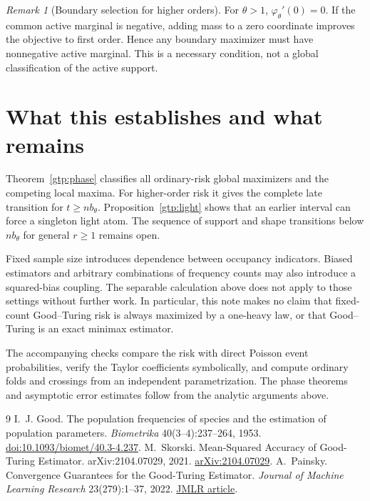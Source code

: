 \documentclass[11pt]{article}
\theoremstyle{remark}\newtheorem{remark}[theorem]{Remark}
\begin{document}
\begin{remark}[Boundary selection for higher orders]
For \(\theta>1\), \(\varphi_\theta'(0)=0\). If the common active marginal is negative, adding mass to a zero coordinate improves the objective to first order. Hence any boundary maximizer must have nonnegative active marginal. This is a necessary condition, not a global classification of the active support.
\end{remark}



\section{What this establishes and what remains}
Theorem~\ref{gtp:phase} classifies all ordinary-risk global maximizers and the competing local maxima. For higher-order risk it gives the complete late transition for $t\ge nb_\theta$. Proposition~\ref{gtp:light} shows that an earlier interval can force a singleton light atom. The sequence of support and shape transitions below $nb_\theta$ for general $r\ge1$ remains open.

Fixed sample size introduces dependence between occupancy indicators. Biased estimators and arbitrary combinations of frequency counts may also introduce a squared-bias coupling. The separable calculation above does not apply to those settings without further work. In particular, this note makes no claim that fixed-count Good--Turing risk is always maximized by a one-heavy law, or that Good--Turing is an exact minimax estimator.

The accompanying checks compare the risk with direct Poisson event probabilities, verify the Taylor coefficients symbolically, and compute ordinary folds and crossings from an independent parametrization. The phase theorems and asymptotic error estimates follow from the analytic arguments above.

\begin{thebibliography}{9}
 I.~J. Good.
The population frequencies of species and the estimation of population parameters.
\emph{Biometrika} 40(3--4):237--264, 1953.
\href{https://doi.org/10.1093/biomet/40.3-4.237}{doi:10.1093/biomet/40.3-4.237}.
 M.~Skorski.
Mean-Squared Accuracy of Good-Turing Estimator.
arXiv:2104.07029, 2021.
\href{https://arxiv.org/abs/2104.07029}{arXiv:2104.07029}.
 A.~Painsky.
Convergence Guarantees for the Good-Turing Estimator.
\emph{Journal of Machine Learning Research} 23(279):1--37, 2022.
\href{https://www.jmlr.org/papers/v23/21-1528.html}{JMLR article}.
\end{thebibliography}
\end{document}
